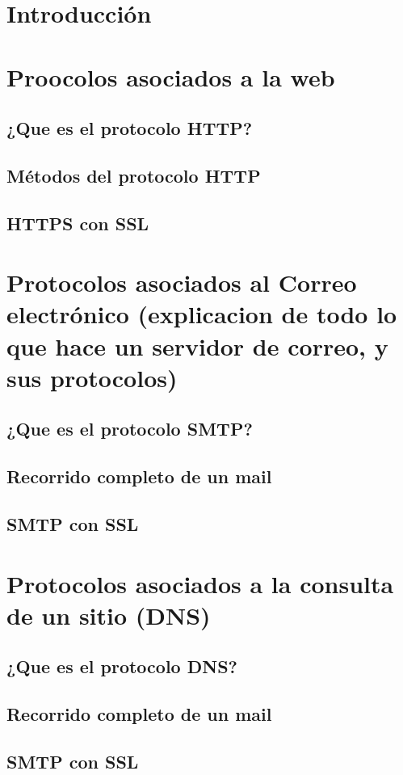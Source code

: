 
\section{Introducción}
\section{Proocolos asociados a la web}
    \subsection{¿Que es el protocolo HTTP?}
    \subsection{Métodos del protocolo HTTP}
    \subsection{HTTPS con SSL}

\section{Protocolos asociados al Correo electrónico (explicacion de todo lo que hace un servidor de correo, y sus protocolos)}
    \subsection{¿Que es el protocolo SMTP?}
    \subsection{Recorrido completo de un mail}
    \subsection{SMTP con SSL}

\section{Protocolos asociados a la consulta de un sitio (DNS)}
    \subsection{¿Que es el protocolo DNS?} 
    \subsection{Recorrido completo de un mail}
    \subsection{SMTP con SSL}




